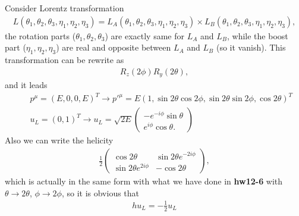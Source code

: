 \documentclass[11pt]{article}
\begin{document}
\section{ }
Consider Lorentz transformation
\begin{eqnarray}
    L(\theta_1, \theta_2, \theta_3, \eta_1, \eta_2, \eta_3)
   = L_A(\theta_1, \theta_2, \theta_3, \eta_1, \eta_2, \eta_3)
   \times L_B(\theta_1, \theta_2, \theta_3, \eta_1, \eta_2, \eta_3),
\end{eqnarray}
the rotation parts ($\theta_1,\theta_2,\theta_3$) are exactly same for $L_A$ and $L_B$, while the boost part ($\eta_1,\eta_2,\eta_3$) are real and opposite
between $L_A$ and $L_B$ (so it vanish). This transformation can be rewrite as
\begin{eqnarray}
    R_z(2\phi)R_y(2\theta),
\end{eqnarray}
and it leads
\begin{eqnarray}
    && p^\mu=(E,0,0,E)^T \to {p'}^\mu =E (1, \sin2\theta\cos2\phi, \sin2\theta\sin2\phi, \cos2\theta)^T \\
    && u_L=(0,1)^T\to u_L= \sqrt{2E}
      \begin{pmatrix}
        -e^{-i \phi}\sin \theta \\ e^{i \phi}\cos \theta.
    \end{pmatrix}
\end{eqnarray}
Also we can write the helicity
\begin{eqnarray}
    \frac{1}{2} 
    \begin{pmatrix}
        \cos2\theta & \sin2\theta e^{-2i\phi} \\ 
        \sin2\theta e^{2i\phi} & -\cos2\theta
    \end{pmatrix},
\end{eqnarray} 
which is actually in the same form with what we have done in {\bf hw12-6} with $\theta \to 2\theta$, $\phi \to 2 \phi$, so it is obvious that
\begin{eqnarray}
    h u_L=-\frac{1}{2}u_L
\end{eqnarray}
\end{document}
